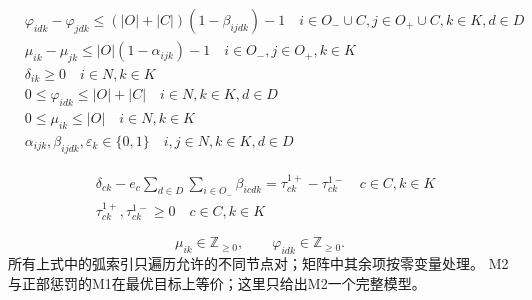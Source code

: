 \documentclass[UTF8,11pt]{ctexart}
\begin{document}
\begin{align}
& \varphi_{i d k}-\varphi_{j d k} \leq(|O|+|C|)(1-\beta_{i j d k})-1 \quad i \in O_{-} \cup C, j \in O_{+} \cup C, k \in K, d \in D \\
& \mu_{i k}-\mu_{j k} \leq|O|(1-\alpha_{i j k})-1 \quad i \in O_{-}, j \in O_{+}, k \in K \\
& \delta_{i k} \geq 0 \quad i \in N, k \in K \\
& 0 \leq \varphi_{i d k} \leq|O|+|C| \quad i \in N, k \in K, d \in D \\
& 0 \leq \mu_{i k} \leq|O| \quad i \in N, k \in K \\
& \alpha_{i j k}, \beta_{i j d k}, \varepsilon_{k} \in\{0,1\} \quad i, j \in N, k \in K, d \in D
\end{align}

\begin{align}
& \delta_{ck} - e_{c} \sum_{d \in D} \sum_{i \in O_{-}} \beta_{icdk} = \tau_{ck}^{1+} - \tau_{ck}^{1-} \quad c \in C, k \in K \\
& \tau_{ck}^{1+}, \tau_{ck}^{1-} \ge 0 \quad c \in C, k \in K
\end{align}


\[
\mu_{ik}\in\mathbb Z_{\ge0},\qquad \varphi_{idk}\in\mathbb Z_{\ge0}.
\]
所有上式中的弧索引只遍历允许的不同节点对；矩阵中其余项按零变量处理。
M2与正部惩罚的M1在最优目标上等价；这里只给出M2一个完整模型。
\end{document}
